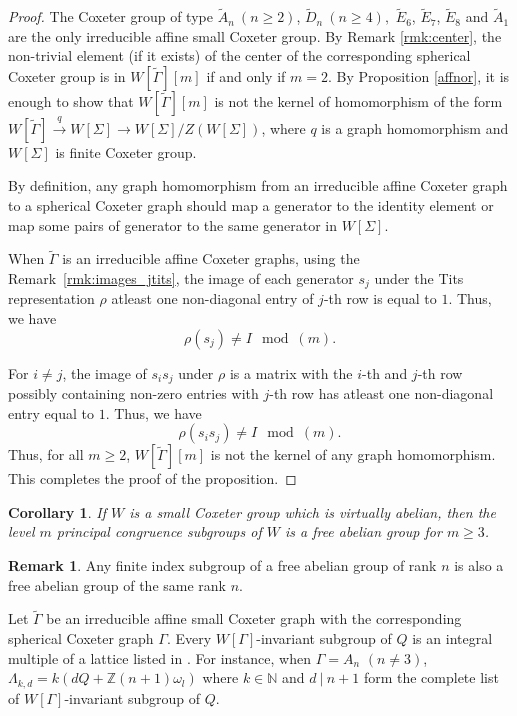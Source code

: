 \documentclass[12pt]{amsart}
\newtheorem{corollary}[equation]{Corollary}
\theoremstyle{definition}
\newtheorem{remark}[equation]{Remark}
\numberwithin{equation}{section}
\begin{document}
\begin{proof}
 The Coxeter group of type $\tilde{A}_n \ (n \geq 2)$,  $\tilde{D}_n \ (n \geq 4),$ $\tilde{E}_6$, $\tilde{E}_7$,  $\tilde{E}_8$ and $\tilde{A}_1$ are the only irreducible affine small Coxeter group. By Remark \ref{rmk:center}, the non-trivial element (if it exists) of the center of the corresponding spherical Coxeter group  is in $W[\tilde{\Gamma}][m]$ if and only if  $m=2$. By Proposition \ref{affnor}, it is enough to show that $W[\tilde{\Gamma}][m]$ is not the kernel of homomorphism of the form $W[\tilde{\Gamma}]\xrightarrow{q} W[\Sigma] \to W[\Sigma]/Z(W[\Sigma])$, where $q$ is a graph homomorphism and $W[\Sigma]$ is finite Coxeter group.

 By definition, any graph homomorphism from an irreducible affine Coxeter graph to a spherical Coxeter graph should map a generator to the identity element or map some pairs of generator  to the same generator in $W[\Sigma]$. 

When $\tilde{\Gamma}$ is an irreducible affine Coxeter graphs, using the Remark~\ref{rmk:images_jtits},  the image of each generator $s_j$ under the Tits representation $\rho$ atleast one non-diagonal entry of  $j$-th row is equal to $1$. Thus, we have $$\rho(s_j)\neq I \mod (m).$$

 For $i\neq j$, the image of  $s_is_j$ under $\rho $ is a matrix with the $i$-th and $j$-th row possibly containing non-zero entries with $j$-th row has atleast one non-diagonal entry equal to $1$. Thus, we have $$\rho(s_is_j)\neq I \mod (m).$$ Thus, for all $m\geq 2$, $W[\tilde{\Gamma}][m]$ is not the kernel of any graph homomorphism. This completes the proof of the proposition.
\end{proof}
\begin{corollary}
If $W$ is a small Coxeter group which is virtually abelian, then the level $m$ principal congruence subgroups of $W$ is a free abelian group for $m\geq 3$. 
\end{corollary}
\begin{remark}\label{rmk:freeabe}
Any finite index subgroup of a free abelian group of rank $n$ is also a free abelian group of the same rank $n$.
\end{remark}

Let $\tilde{\Gamma}$ be an irreducible affine small Coxeter graph with the corresponding spherical Coxeter graph $\Gamma$. Every $W[\Gamma]$-invariant subgroup of $Q$ is an integral multiple of a lattice listed in \cite[Table 5]{MR1490241}. For instance, when $\Gamma=A_n$ $(n\neq 3)$,  $\Lambda_{k,d}=k(dQ+\mathbb Z(n+1)\omega_l)$ where $k\in \mathbb N$ and $d~|~n+1$ form the complete list of $W[\Gamma]$-invariant subgroup of $Q$. 
\end{document}
